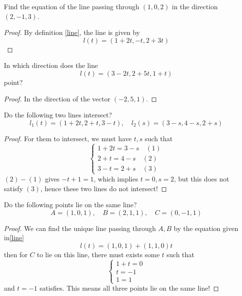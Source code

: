 \documentclass[openany]{book}
\begin{document}
\begin{prob}
    Find the equation of the line passing through $(1,0,2)$ in the direction $(2,-1,3)$.
\end{prob}
\begin{proof}
    By definition \ref{line}, the line is given by 
    \begin{equation*}
        l(t)=(1+2t, -t, 2+3t)
    \end{equation*}
\end{proof}

\begin{prob}
    In which direction does the line 
    \begin{equation*}
        l(t)=(3-2t, 2+5t, 1+t)
    \end{equation*}
    point?
\end{prob}
\begin{proof}
    In the direction of the vector $(-2, 5, 1)$.
\end{proof}


\begin{prob}
    Do the following two lines intersect?
    \begin{equation*}
        l_1(t)=(1+2t, 2+t, 3-t), \quad l_2(s)=(3-s, 4-s, 2+s)
    \end{equation*}
\end{prob}
\begin{proof}
    For them to intersect, we must have $t,s$ such that 
    \begin{equation*}
        \begin{cases}
            1+2t=3-s \quad (1)\\
            2+t=4-s \quad (2)\\
            3-t=2+s \quad (3)
        \end{cases}
    \end{equation*}
    $(2)-(1)$ gives $-t+1=1$, which implies $t=0, s=2$, but this does not satisfy $(3)$, hence these two lines do not intersect!
\end{proof}


\begin{prob}
    Do the following points lie on the same line?
    \begin{equation*}
        A=(1,0,1),\quad B=(2,1,1), \quad C=(0,-1,1)
    \end{equation*}
\end{prob}
\begin{proof}
    We can find the unique line passing through $A,B$ by the equation given in\ref{line}
    \begin{equation*}
        l(t)=(1,0,1)+(1,1,0)t
    \end{equation*}
    then for $C$ to lie on this line, there must exists some $t$ such that 
    \begin{equation*}
        \begin{cases}
            1+t=0\\
            t=-1\\
            1=1
        \end{cases}
    \end{equation*}
    and $t=-1$ satisfies. This means all three points lie on the same line!
\end{proof}
\end{document}
